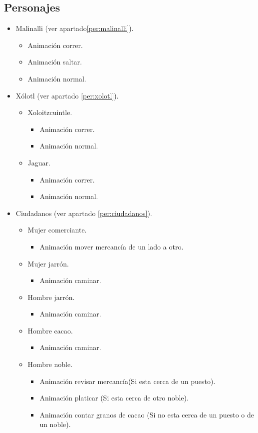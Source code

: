 	\subsection{Personajes}
\begin{itemize}
\item Malinalli (ver apartado\ref{per:malinalli}).
	\begin{itemize}
		\item Animación correr.
		\item Animación saltar. 
		\item Animación normal. 
	\end{itemize}	
\item Xólotl (ver apartado \ref{per:xolotl}).
	\begin{itemize}
		\item Xoloitzcuintle.
			\begin{itemize}
				\item Animación correr.
				\item Animación normal. 
		\end{itemize}	
		\item Jaguar.
			\begin{itemize}
				\item Animación correr.
				\item Animación normal. 
		\end{itemize}	
	\end{itemize}	

\item Ciudadanos (ver apartado \ref{per:ciudadanos}).
	\begin{itemize}
		\item Mujer comerciante. 
			\begin{itemize}
				\item Animación mover mercancía de un lado a otro.
			\end{itemize}
		\item Mujer jarrón.
			\begin{itemize}
				\item Animación caminar.
			\end{itemize}			 
		\item Hombre jarrón.
			\begin{itemize}
				\item Animación caminar.
			\end{itemize} 
		\item Hombre cacao.
			\begin{itemize}
				\item Animación caminar.
			\end{itemize}
		\item Hombre noble.
			\begin{itemize}
				\item Animación revisar mercancía(Si esta cerca de un puesto). 
				\item Animación platicar (Si esta cerca de otro noble).
				\item Animación contar granos de cacao (Si no esta cerca de un puesto o de un noble).
			\end{itemize}				
	\end{itemize}	 
\end{itemize}
